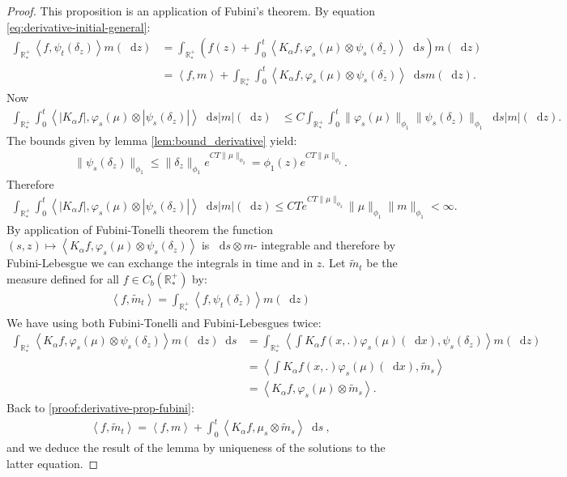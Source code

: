 \documentclass[11pt,a4paper]{article}
\newcommand{\RRP}{\mathbb{R}^+_*}
\newcommand{\brac}[1]{\left\langle#1\right\rangle}
\newcommand{\dd}{\mathop{}\!\mathrm{d}}
\begin{document}
\begin{proof}
    This proposition is an application of Fubini's theorem. By equation \eqref{eq:derivative-initial-general}:
    \begin{align}
        \int_{\RRP} \brac{f,\psi_t\left(\delta_z\right)}m(\dd z) &= \int_{\RRP}\left( f(z) + \int_0^t \brac{K_\alpha f,\varphi_s(\mu)\otimes\psi_s\left(\delta_z\right)} \dd s \right)m(\dd z) \nonumber\\
        &= \brac{f,m} + \int_{\RRP}\int_0^t \brac{K_\alpha f,\varphi_s(\mu)\otimes\psi_s\left(\delta_z\right)} \dd sm(\dd z).\label{proof:derivative-prop-fubini}
    \end{align}
    Now 
    \begin{align*}
        \int_{\RRP}\int_0^t \brac{ |K_\alpha f|,\varphi_s(\mu)\otimes|\psi_s\left(\delta_z\right)|} \dd s |m|(\dd z) 
        &\leq C\int_{\RRP}\int_0^t\|\varphi_s(\mu)\|_{\phi_1}  \|\psi_s(\delta_z)\|_{\phi_1}\dd s |m|(\dd z).
    \end{align*}
    The bounds given by lemma \ref{lem:bound_derivative} yield: 
    \begin{align*}
        \|\psi_s(\delta_z)\|_{\phi_1} \leq \|\delta_z\|_{\phi_1}e^{CT\|\mu\|_{\phi_2}} = \phi_1(z)e^{CT\|\mu\|_{\phi_2}}.
    \end{align*}
    Therefore
    \begin{align*}
        \int_{\RRP}\int_0^t \brac{ |K_\alpha f|,\varphi_s(\mu)\otimes|\psi_s\left(\delta_z\right)|} \dd s |m|(\dd z)  \leq CT e^{CT\|\mu\|_{\phi_2}}\|\mu\|_{\phi_1}\|m\|_{\phi_1} < \infty.
    \end{align*}
    By application of Fubini-Tonelli theorem the function $(s,z) \mapsto \brac{ K_\alpha f,\varphi_s(\mu)\otimes\psi_s\left(\delta_z\right)}$ is $\dd s \otimes m$- integrable and therefore by Fubini-Lebesgue we can exchange the integrals in time and in $z$. Let $\tilde{m}_t$ be the measure defined for all $f \in C_b(\RRP)$ by:
    \begin{align*}
        \brac{f,\tilde{m}_t} = \int_{\RRP} \brac{f,\psi_t\left(\delta_z\right)}m(\dd z)
    \end{align*}
    We have using both Fubini-Tonelli and Fubini-Lebesgues twice:
    \begin{align*}
        \int_{\RRP} \brac{K_\alpha f,\varphi_s(\mu)\otimes\psi_s\left(\delta_z\right)} m(\dd z) \dd s 
        &= \int_{\RRP} \brac{\int K_\alpha f(x,.)\varphi_s(\mu)(\dd x), \psi_s(\delta_z)} m(\dd z) \\
        &= \brac{\int K_\alpha f(x,.)\varphi_s(\mu)(\dd x),\tilde{m}_s} \\
        &= \brac{K_\alpha f, \varphi_s(\mu) \otimes \tilde{m}_s}.
    \end{align*}
    Back to \eqref{proof:derivative-prop-fubini}:
    \begin{align*}
        \brac{f,\tilde{m}_t} = \brac{f,m} + \int_0^t \brac{K_\alpha f, \mu_s \otimes \tilde{m}_s} \dd s\ ,
    \end{align*}
    and we deduce the result of the lemma by uniqueness of the solutions to the latter equation.
\end{proof}
\end{document}
